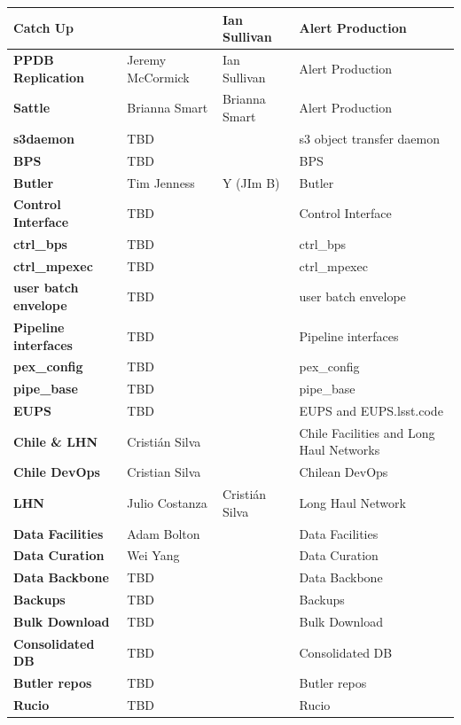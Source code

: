 \begin{longtable} {
|p{}   |p{}|p{} |p{}|}
{\textbf{Catch Up}} &  & Ian Sullivan & Alert Production \\ \hline
{\textbf{PPDB Replication}} & Jeremy McCormick & Ian Sullivan & Alert Production \\ \hline
{\textbf{Sattle}} & Brianna Smart & Brianna Smart & Alert Production \\ \hline
{\textbf{s3daemon}} & TBD &  & s3 object transfer daemon \\ \hline
{\textbf{BPS}} & TBD &  & BPS \\ \hline
{\textbf{Butler}} & Tim Jenness & Y (JIm B) & Butler \\ \hline
{\textbf{Control Interface}} & TBD &  & Control Interface \\ \hline
{\textbf{ctrl\_bps}} & TBD &  & ctrl\_bps \\ \hline
{\textbf{ctrl\_mpexec}} & TBD &  & ctrl\_mpexec \\ \hline
{\textbf{user batch envelope}} & TBD &  & user batch envelope \\ \hline
{\textbf{Pipeline interfaces}} & TBD &  & Pipeline interfaces \\ \hline
{\textbf{pex\_config}} & TBD &  & pex\_config \\ \hline
{\textbf{pipe\_base}} & TBD &  & pipe\_base \\ \hline
{\textbf{EUPS}} & TBD &  & EUPS and EUPS.lsst.code \\ \hline
{\textbf{Chile \&  LHN}} & Cristián Silva &  & Chile Facilities  and Long Haul Networks \\ \hline
{\textbf{Chile DevOps}} & Cristian Silva &  & Chilean DevOps \\ \hline
{\textbf{LHN}} & Julio Costanza & Cristián Silva & Long Haul Network \\ \hline
{\textbf{Data Facilities}} & Adam Bolton &  & Data Facilities \\ \hline
{\textbf{Data Curation}} & Wei Yang &  & Data Curation \\ \hline
{\textbf{Data Backbone}} & TBD &  & Data Backbone \\ \hline
{\textbf{Backups}} & TBD &  & Backups \\ \hline
{\textbf{Bulk Download}} & TBD &  & Bulk Download \\ \hline
{\textbf{Consolidated DB}} & TBD &  & Consolidated DB \\ \hline
{\textbf{Butler repos}} & TBD &  & Butler repos \\ \hline
{\textbf{Rucio}} & TBD &  & Rucio \\ \hline

\end{longtable}
